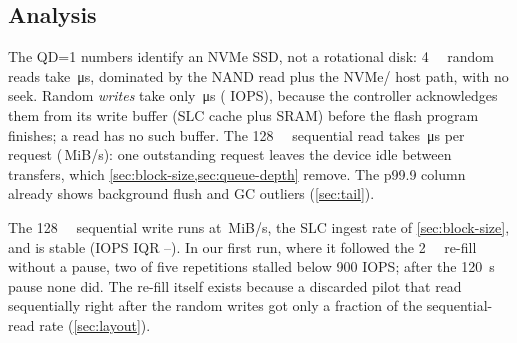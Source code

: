 \subsection{Analysis}
The QD=1 numbers identify an NVMe SSD, not a rotational disk: \qty{4}{\kibi\byte} random reads take
\,\si{\micro\second}, dominated by the
NAND read plus the NVMe/ host path, with no seek. Random \emph{writes} take only
\,\si{\micro\second}
( IOPS), because the controller acknowledges them
from its write buffer (SLC cache plus SRAM) before the flash program finishes; a read has no such buffer.
The \qty{128}{\kibi\byte} sequential
read takes \,\si{\micro\second} per
request (\,MiB/s): one outstanding request leaves
the device idle between transfers, which \cref{sec:block-size,sec:queue-depth} remove. The p99.9 column
already shows background flush and GC outliers (\cref{sec:tail}).

The \qty{128}{\kibi\byte} sequential write runs at
\,MiB/s, the SLC ingest rate of
\cref{sec:block-size}, and is stable (IOPS IQR
--).
In our first run, where it followed the \qty{2}{\gibi\byte} re-fill without a pause, two of five
repetitions stalled below \num{900} IOPS; after the \qty{120}{\second} pause none did. The re-fill itself
exists because a discarded pilot that read sequentially right after the random writes got only a fraction
of the sequential-read rate (\cref{sec:layout}).
